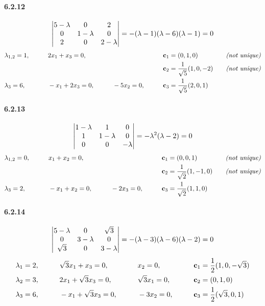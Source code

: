 \documentclass[a4paper]{article}
\begin{document}
\paragraph{6.2.12}
\[
\begin{vmatrix}
 5-\lambda&0 &2 \\
 0& 1-\lambda&0 \\
 2& 0& 2-\lambda
\end{vmatrix}=
-(\lambda-1)(\lambda-6)(\lambda-1)=0
\]
\begin{alignat*}{5}
    & \lambda_{1,2}=1 ,\qquad && 2x_1+x_3=0,\qquad && \qquad && \mathbf{c}_1=(0,1,0)  \quad &&\textit{(not unique)}\\
    & \qquad && \qquad && \qquad && \mathbf{c}_2=\frac{1}{\sqrt{5}}(1,0,-2)  \quad &&\textit{(not unique)}\\
    & \lambda_3=6 ,\qquad && -x_1+2x_3=0,\qquad && -5x_2=0,\qquad && \mathbf{c}_3=\frac{1}{\sqrt{5}}(2,0,1)  \\
\end{alignat*}

\paragraph{6.2.13}
\[
\begin{vmatrix}
 1-\lambda& 1&0 \\
 1& 1-\lambda&0 \\
 0& 0& -\lambda
\end{vmatrix}=
-\lambda^2(\lambda-2)=0
\]
\begin{alignat*}{5}
    & \lambda_{1,2}=0 ,\qquad && x_1+x_2=0,\qquad && \qquad && \mathbf{c}_1=(0,0,1)  \quad &&\textit{(not unique)}\\
    & \qquad && \qquad && \qquad && \mathbf{c}_2=\frac{1}{\sqrt{2}}(1,-1,0)  \quad &&\textit{(not unique)}\\
    & \lambda_3=2 ,\qquad && -x_1+x_2=0,\qquad && -2x_3=0,\qquad && \mathbf{c}_3=\frac{1}{\sqrt{2}}(1,1,0)  \\
\end{alignat*}

\paragraph{6.2.14}
\[
\begin{vmatrix}
 5-\lambda&0 &\sqrt{3} \\
 0& 3-\lambda&0 \\
 \sqrt{3}&0 & 3-\lambda
\end{vmatrix}=
-(\lambda-3)(\lambda-6)(\lambda-2)=0
\]
\begin{alignat*}{4}
    & \lambda_1=2 ,\qquad && \sqrt{3}x_1+x_3=0,\qquad && x_2=0,\qquad && \mathbf{c}_1=\frac{1}{2}(1,0,-\sqrt{3})\\
    & \lambda_2=3 ,\qquad && 2x_1+\sqrt{3}x_3=0,\qquad && \sqrt{3}x_1=0,\qquad && \mathbf{c}_2=(0,1,0)\\
    & \lambda_3=6 ,\qquad && -x_1+\sqrt{3}x_3=0,\qquad && -3x_2=0,\qquad && \mathbf{c}_3=\frac{1}{2}(\sqrt{3},0,1)\\
\end{alignat*}
\end{document}
